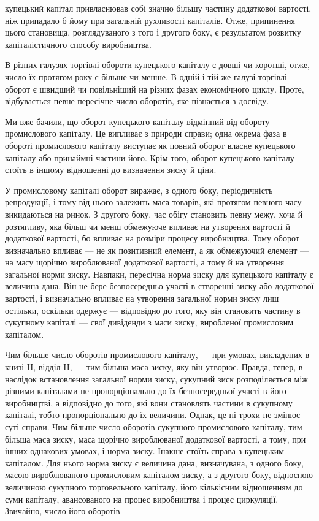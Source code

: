 \parcont{}  %
купецький капітал привласнював собі значно більшу частину додаткової
вартості, ніж припадало б йому при загальній рухливості
капіталів. Отже, припинення цього становища, розглядуваного
з того і другого боку, є результатом розвитку капіталістичного
способу виробництва.

В різних галузях торгівлі обороти купецького капіталу є довші
чи коротші, отже, число їх протягом року є більше чи менше.
В одній і тій же галузі торгівлі оборот є швидший чи повільніший
на різних фазах економічного циклу. Проте, відбувається
певне пересічне число оборотів, яке пізнається з досвіду.

Ми вже бачили, що оборот купецького капіталу відмінний
від обороту промислового капіталу. Це випливає з природи
справи; одна окрема фаза в обороті промислового капіталу виступає
як повний оборот власне купецького капіталу або принаймні
частини його. Крім того, оборот купецького капіталу стоїть
в іншому відношенні до визначення зиску й ціни.

У промисловому капіталі оборот виражає, з одного боку, періодичність
репродукції, і тому від нього залежить маса товарів,
які протягом певного часу викидаються на ринок. З другого
боку, час обігу становить певну межу, хоча й розтягливу, яка
більш чи менш обмежуюче впливає на утворення вартості й додаткової
вартості, бо впливає на розміри процесу виробництва.
Тому оборот визначально впливає — не як позитивний елемент,
а як обмежуючий елемент — на масу щорічно вироблюваної
додаткової вартості, а тому й на утворення загальної норми
зиску. Навпаки, пересічна норма зиску для купецького капіталу
є величина дана. Він не бере безпосередньо участі в створенні
зиску або додаткової вартості, і визначально впливає на утворення
загальної норми зиску лиш остільки, оскільки одержує — відповідно
до того, яку він становить частину в сукупному капіталі —
свої дивіденди з маси зиску, виробленої промисловим капіталом.

Чим більше число оборотів промислового капіталу, — при
умовах, викладених в книзі II, відділ II, — тим більша маса зиску,
яку він утворює. Правда, тепер, в наслідок встановлення
загальної норми зиску, сукупний зиск розподіляється між різними
капіталами не пропорціонально до їх безпосередньої участі
в його виробництві, а відповідно до того, які вони становлять
частини в сукупному капіталі, тобто пропорціонально до їх величини.
Однак, це ні трохи не змінює суті справи. Чим більше
число оборотів сукупного промислового капіталу, тим більша
маса зиску, маса щорічно вироблюваної додаткової вартості,
а тому, при інших однакових умовах, і норма зиску. Інакше
стоїть справа з купецьким капіталом. Для нього норма зиску є
величина дана, визначувана, з одного боку, масою вироблюваного
промисловим капіталом зиску, а з другого боку, відносною величиною
сукупного торговельного капіталу, його кількісним відношенням
до суми капіталу, авансованого на процес виробництва
і процес циркуляції. Звичайно, число його оборотів
\parbreak{}  %
